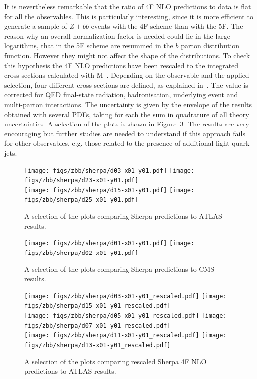 \documentclass[11pt]{cernrep}
\newcommand{\MCFM}{M\protect\scalebox{0.8}{CFM}\xspace}
\begin{document}
It is nevertheless remarkable that the ratio of 4F NLO predictions to data is
flat for all the observables. This is particularly interesting, since it is
more efficient to generate a sample of $Z+b\bar{b}$ events with the 4F scheme
than with the 5F. The reason why an overall normalization factor is needed
could lie in the large logarithms, that in the 5F scheme are resummed in the
$b$ parton distribution function. However they might not affect the shape of
the distributions. To check this hypothesis the 4F NLO predictions have been
rescaled to the integrated cross-sections calculated with
\MCFM~\cite{Campbell:2010ff}. Depending on the observable and the applied
selection, four different cross-sections are defined, as explained
in~\cite{Aad:2014dvb}. The value is corrected for QED final-state
radiation, hadronisation, underlying event and multi-parton
interactions. The uncertainty is given by the envelope of
the results obtained with several PDFs, taking for each the sum in quadrature of all theory uncertainties.
A selection of the plots is shown in
Figure~\ref{zbb-sherpa-scaled}. The results are very encouraging but further
studies are needed to understand if this approach fails for other
observables, e.g. those related to the presence of additional light-quark
jets.

\begin{figure}[htbp]
\begin{center}
   \texttt{[image: figs/zbb/sherpa/d03-x01-y01.pdf]}
   \texttt{[image: figs/zbb/sherpa/d23-x01-y01.pdf]} \\
   \texttt{[image: figs/zbb/sherpa/d15-x01-y01.pdf]}
   \texttt{[image: figs/zbb/sherpa/d25-x01-y01.pdf]}
\caption{A selection of the plots comparing Sherpa predictions to ATLAS results.}
\label{zbb-sherpa-atlas}
\end{center}
\end{figure}
\begin{figure}[htbp]
   \texttt{[image: figs/zbb/sherpa/d01-x01-y01.pdf]}
   \texttt{[image: figs/zbb/sherpa/d02-x01-y01.pdf]}
\caption{A selection of the plots comparing Sherpa predictions to CMS results.}
\label{zbb-sherpa-cms}
\end{figure}
\begin{figure}[htbp]
\begin{center}
   \texttt{[image: figs/zbb/sherpa/d03-x01-y01\_rescaled.pdf]}
   \texttt{[image: figs/zbb/sherpa/d15-x01-y01\_rescaled.pdf]} \\
   \texttt{[image: figs/zbb/sherpa/d05-x01-y01\_rescaled.pdf]} 
   \texttt{[image: figs/zbb/sherpa/d07-x01-y01\_rescaled.pdf]} \\
   \texttt{[image: figs/zbb/sherpa/d11-x01-y01\_rescaled.pdf]} 
   \texttt{[image: figs/zbb/sherpa/d13-x01-y01\_rescaled.pdf]}
\caption{A selection of the plots
  comparing rescaled Sherpa 4F NLO predictions to ATLAS results.}
\label{zbb-sherpa-scaled}
\end{center}
\end{figure}
\end{document}
